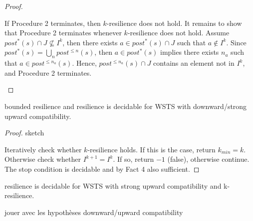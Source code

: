 \begin{proof}
\begin{enumerate}
If Procedure 2 terminates, then
$k$-resilience does not hold.
It remains to show that Procedure 2 terminates whenever $k$-resilience does not hold.
Assume $ post^*(s) \cap J \not\subseteq I^k$, then there exists $a \in post^*(s) \cap J$ such that $a \not\in I^k$. Since $post^*(s) = \bigcup_{n} post^{\leq n}(s)$, then 
$a \in post^*(s)$
implies
there exists
$n_a$
such that
$a \in post^{\leq n_a}(s)$.
Hence,  $post^{\leq n_a}(s) \cap J$ contains an element not in 
$I^k$,
and Procedure 2 terminates.
\end{enumerate}

\end{proof}



\begin{theorem}
{\sc bounded resilience} and {\sc resilience} is decidable for WSTS with downward/strong upward compatibility.
\end{theorem}

\begin{proof}{sketch}

Iteratively check whether $k$-resilience holds. 
If this is the case, return $k_{min} = k$. Otherwise check whether 
$I^{k+1} = I^k$. If so, return $-1$ (false), otherwise
continue.
The stop condition is decidable
and by Fact 4 also sufficient. 
\end{proof}

{\sc resilience} is decidable for WSTS with strong upward compatibility and k-resilience.

jouer avec les hypothèses downward/upward compatibility



